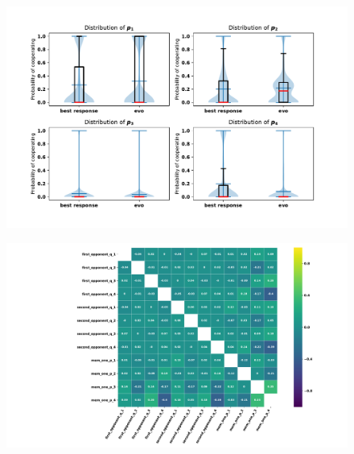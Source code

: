 \documentclass[10pt]{article}
\begin{document}
\begin{figure}
    \centering
    \includegraphics[width=\textwidth]{img/behaviour_violin_plots.pdf}
\end{figure}

\begin{table}
    
\end{table}

\begin{table}
    
\end{table}


\begin{figure}
    \centering
    \includegraphics[width=\textwidth]{img/best_response_correlation.pdf}
\end{figure}
\end{document}
